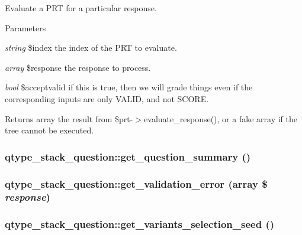 \label{classqtype__stack__question_a2b51301e407f2ca52ae85778496cf43e}
Evaluate a PRT for a particular response. 
\begin{DoxyParams}{Parameters}
\item[{\em string}]\$index the index of the PRT to evaluate. \item[{\em array}]\$response the response to process. \item[{\em bool}]\$acceptvalid if this is true, then we will grade things even if the corresponding inputs are only VALID, and not SCORE. \end{DoxyParams}
\begin{DoxyReturn}{Returns}
array the result from \$prt-\/$>$evaluate\_\-response(), or a fake array if the tree cannot be executed. 
\end{DoxyReturn}
\hypertarget{classqtype__stack__question_a754e93fccfebf8e5019174322b4d9fcc}{
\subsubsection[{get\_\-question\_\-summary}]{\setlength{\rightskip}{0pt plus 5cm}qtype\_\-stack\_\-question::get\_\-question\_\-summary ()}}
\label{classqtype__stack__question_a754e93fccfebf8e5019174322b4d9fcc}
\hypertarget{classqtype__stack__question_aa96049e70ad133602506d6a1d2654a10}{
\subsubsection[{get\_\-validation\_\-error}]{\setlength{\rightskip}{0pt plus 5cm}qtype\_\-stack\_\-question::get\_\-validation\_\-error (array \$ {\em response})}}
\label{classqtype__stack__question_aa96049e70ad133602506d6a1d2654a10}
\hypertarget{classqtype__stack__question_a126164aa2828ef593b96a4cc650e64b8}{
\subsubsection[{get\_\-variants\_\-selection\_\-seed}]{\setlength{\rightskip}{0pt plus 5cm}qtype\_\-stack\_\-question::get\_\-variants\_\-selection\_\-seed ()}}

